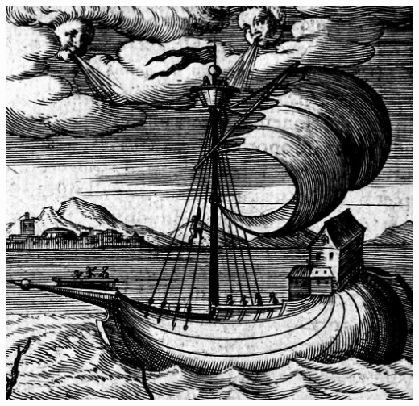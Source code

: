 \bigskip
\bigskip
\bigskip
\begin{center}
\includegraphics[width=1\textwidth]{images/brev27.png}
\end{center}

\breakpage